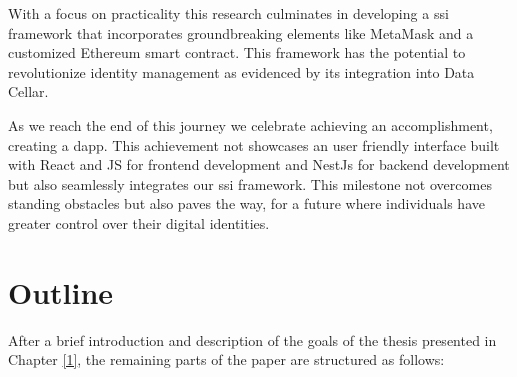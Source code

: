 With a focus on practicality this research culminates in developing a \gls{ssi} framework that incorporates groundbreaking elements like MetaMask and a customized Ethereum smart 
contract. This framework has the potential to revolutionize identity management as evidenced by its integration into Data Cellar.

As we reach the end of this journey we celebrate achieving an accomplishment, creating a \acrfull{dapp}. This achievement not showcases an user friendly interface 
built with React and JS for frontend development and NestJs for backend development but also seamlessly integrates our \gls{ssi} framework. This milestone not overcomes standing 
obstacles but also paves the way, for a future where individuals have greater control over their digital identities.

\section{Outline}

After a brief introduction and description of the goals of the thesis presented in Chapter \hyperref[ch:introduction]{[1]}, the remaining parts of the paper are structured as follows:

